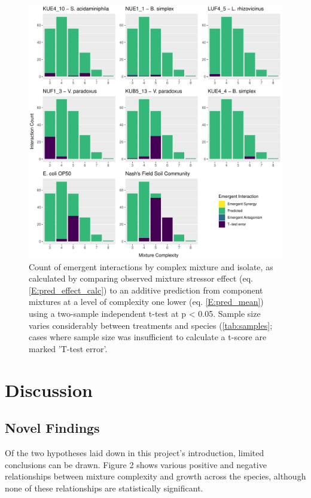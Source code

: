 \documentclass[final,1p,times]{elsarticle}
\begin{document}
\begin{figure}[H]
    \centering
    \includegraphics[width = \textwidth]{Scripts/Results/Final_Pipeline/histogram_interaction_emergent.pdf}
    \caption{Count of emergent interactions by complex mixture and isolate, as calculated by comparing observed mixture stressor effect (eq. \ref{E:pred_effect_calc}) to an additive prediction from component mixtures at a level of complexity one lower (eq. \ref{E:pred_mean}) using a two-sample independent t-test at p < 0.05. Sample size varies considerably between treatments and species (\cref{tab:samples}; cases where sample size was insufficient to calculate a t-score are marked 'T-test error'.}
    \label{fig:histogram_interaction_emergent}
\end{figure}

\newpage
\section{Discussion}
\label{S:4}

\subsection{Novel Findings}
\label{S:4:1}

Of the two hypotheses laid down in this project’s introduction, limited conclusions can be drawn. Figure 2 shows various positive and negative relationships between mixture complexity and growth across the species, although none of these relationships are statistically significant. 
\end{document}
